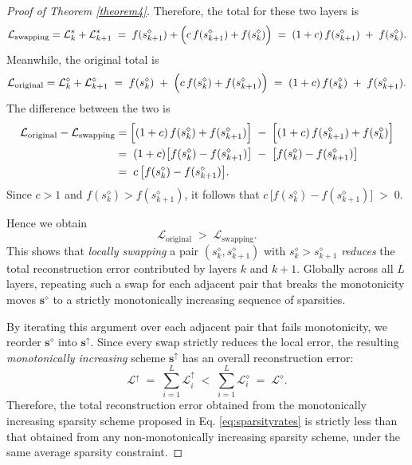 \begin{proof}[Proof of Theorem \ref{theorem4}]
Therefore, the total for these two layers is
\begin{equation}
  \mathcal{L}_\text{swapping}= \mathcal{L}_k^\ast + \mathcal{L}_{k+1}^\ast 
  \;=\; f(s_{k+1}^\diamond) 
  + \Bigl(c\,f(s_{k+1}^\diamond) + f(s_k^\diamond)\Bigr)
  \;=\; (1 + c)\,f(s_{k+1}^\diamond) \;+\; f(s_k^\diamond).
\end{equation}
Meanwhile, the original total is
\begin{equation}
  \mathcal{L}_\text{original}= \mathcal{L}_k^\diamond + \mathcal{L}_{k+1}^\diamond 
  \;=\; f(s_k^\diamond) 
  \;+\; \Bigl(c\,f(s_k^\diamond) + f(s_{k+1}^\diamond)\Bigr)
  \;=\; (1 + c)\,f(s_k^\diamond) \;+\; f(s_{k+1}^\diamond).
\end{equation}
The difference between the two is
\begin{equation}
\begin{aligned}
   \mathcal{L}_\text{original}-\mathcal{L}_\text{swapping}
   &=\Bigl[(1 + c)\,f(s_k^\diamond) + f(s_{k+1}^\diamond)\Bigr]
    \;-\;\Bigl[(1 + c)\,f(s_{k+1}^\diamond) + f(s_k^\diamond)\Bigr]\\
   &=\;(1 + c)\bigl[f(s_k^\diamond) - f(s_{k+1}^\diamond)\bigr]
      \;-\;\bigl[f(s_k^\diamond) - f(s_{k+1}^\diamond)\bigr]\\
   &=\;c\,\bigl[f(s_k^\diamond) - f(s_{k+1}^\diamond)\bigr].
\end{aligned}
\end{equation}
Since $c > 1$ and $f(s_k^\diamond) > f(s_{k+1}^\diamond)$, it follows that \(c\,\bigl[f(s_k^\diamond) - f(s_{k+1}^\diamond)\bigr] \;>\; 0.\)

Hence we obtain
\begin{equation}
  \mathcal{L}_\text{original}
  \;>\; \mathcal{L}_\text{swapping} .
\end{equation}
This shows that \emph{locally swapping} a pair $(s_k^\diamond, s_{k+1}^\diamond)$ with $s_k^\diamond> s_{k+1}^\diamond$ \emph{reduces} the total reconstruction error contributed by layers $k$ and $k+1$. Globally across all $L$ layers, repeating such a swap for each adjacent pair that breaks the monotonicity moves $\mathbf{s}^\diamond$ to a strictly monotonically increasing sequence of sparsities.

By iterating this argument over each adjacent pair that fails monotonicity, we reorder $\mathbf{s}^\diamond$ into  $\mathbf{s}^\uparrow$. Since every swap strictly reduces the local error, the resulting \textit{monotonically increasing} scheme $\mathbf{s}^\uparrow$ has an overall reconstruction error:
\begin{equation}
  \mathcal{L}^\uparrow 
  \;=\; \sum_{i=1}^{L} \mathcal{L}_i^\uparrow
  \;<\; \sum_{i=1}^{L} \mathcal{L}_i^\diamond
  \;=\; \mathcal{L}^\diamond.
\end{equation}
Therefore, the total reconstruction error obtained from the monotonically increasing sparsity scheme proposed in Eq. \ref{eq:sparsityrates} is strictly less than that obtained from any non-monotonically increasing sparsity scheme, under the same average sparsity constraint.

\end{proof}


